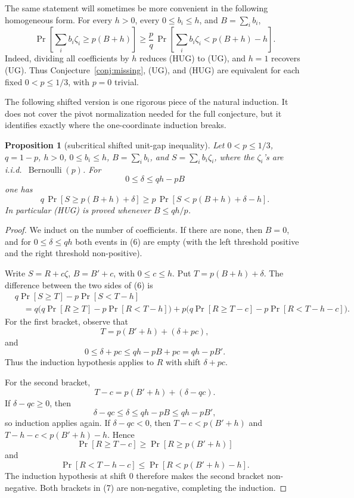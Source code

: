 \documentclass[12pt]{article}
\newtheorem{proposition}{Proposition}
\newcommand{\Ber}{\operatorname{Bernoulli}}
\begin{document}
The same statement will sometimes be more convenient in the following
homogeneous form.  For every \(h>0\), every \(0\le b_i\le h\), and
\(B=\sum_i b_i\),
\[
 \Pr\!\left[\sum_i b_i\zeta_i\ge p(B+h)\right]
 \ge
 \frac{p}{q}\,
 \Pr\!\left[\sum_i b_i\zeta_i<p(B+h)-h\right].            \tag{HUG}
\]
Indeed, dividing all coefficients by \(h\) reduces (HUG) to (UG), and \(h=1\)
recovers (UG).  Thus Conjecture~\ref{conj:missing}, (UG), and (HUG) are
equivalent for each fixed \(0<p\le1/3\), with \(p=0\) trivial.

The following shifted version is one rigorous piece of the natural induction.
It does not cover the pivot normalization needed for the full conjecture, but it
identifies exactly where the one-coordinate induction breaks.

\begin{proposition}[subcritical shifted unit-gap inequality]\label{prop:subcritical}
Let \(0<p\le1/3\), \(q=1-p\), \(h>0\), \(0\le b_i\le h\), \(B=\sum_i b_i\),
and \(S=\sum_i b_i\zeta_i\), where the \(\zeta_i\)'s are i.i.d.\ \(\Ber(p)\).
For
\[
        0\le \delta\le qh-pB
\]
one has
\[
 q\,\Pr\!\left[S\ge p(B+h)+\delta\right]
 \ge
 p\,\Pr\!\left[S<p(B+h)+\delta-h\right].                 \tag{6}
\]
In particular (HUG) is proved whenever \(B\le qh/p\).
\end{proposition}

\begin{proof}
We induct on the number of coefficients.  If there are none, then
\(B=0\), and for \(0\le\delta\le qh\) both events in (6) are empty (with the
left threshold positive and the right threshold non-positive).

Write \(S=R+c\zeta\), \(B=B'+c\), with \(0\le c\le h\).  Put
\(T=p(B+h)+\delta\).  The difference between the two sides of (6) is
\begin{equation}
\begin{aligned}
& q\Pr[S\ge T]-p\Pr[S<T-h]                                      \\
&\quad =
q\Big(q\Pr[R\ge T]-p\Pr[R<T-h]\Big)
+p\Big(q\Pr[R\ge T-c]-p\Pr[R<T-h-c]\Big).
\end{aligned}                                                   \tag{7}
\end{equation}
For the first bracket, observe that
\[
        T=p(B'+h)+(\delta+pc),
\]
and
\[
        0\le\delta+pc\le qh-pB+pc=qh-pB'.
\]
Thus the induction hypothesis applies to \(R\) with shift \(\delta+pc\).

For the second bracket,
\[
        T-c=p(B'+h)+(\delta-qc).
\]
If \(\delta-qc\ge0\), then
\[
        \delta-qc\le\delta\le qh-pB\le qh-pB',
\]
so induction applies again.  If \(\delta-qc<0\), then
\(T-c<p(B'+h)\) and \(T-h-c<p(B'+h)-h\).  Hence
\[
 \Pr[R\ge T-c]\ge \Pr[R\ge p(B'+h)]
\]
and
\[
 \Pr[R<T-h-c]\le \Pr[R<p(B'+h)-h].
\]
The induction hypothesis at shift \(0\) therefore makes the second bracket
non-negative.  Both brackets in (7) are non-negative, completing the induction.
\end{proof}
\end{document}
